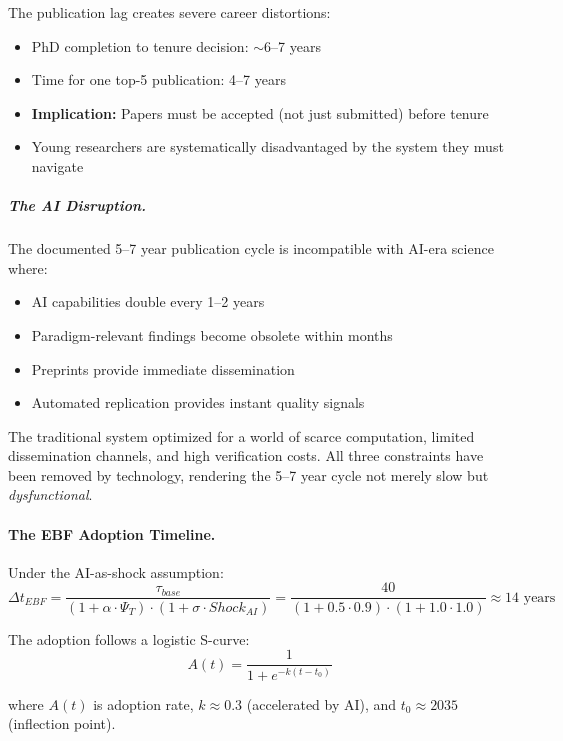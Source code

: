 The publication lag creates severe career distortions:
\begin{itemize}[nosep]
    \item PhD completion to tenure decision: $\sim$6--7 years
    \item Time for one top-5 publication: 4--7 years
    \item \textbf{Implication:} Papers must be accepted (not just submitted) before tenure
    \item Young researchers are systematically disadvantaged by the system they must navigate
\end{itemize}

\subparagraph{The AI Disruption.}

The documented 5--7 year publication cycle is incompatible with AI-era science where:
\begin{itemize}[nosep]
    \item AI capabilities double every 1--2 years
    \item Paradigm-relevant findings become obsolete within months
    \item Preprints provide immediate dissemination
    \item Automated replication provides instant quality signals
\end{itemize}

The traditional system optimized for a world of scarce computation, limited
dissemination channels, and high verification costs. All three constraints
have been removed by technology, rendering the 5--7 year cycle not merely
slow but \textit{dysfunctional}.

\paragraph{The EBF Adoption Timeline.}

Under the AI-as-shock assumption:
\begin{equation}
\Delta t_{EBF} = \frac{\tau_{base}}{(1 + \alpha \cdot \Psi_T) \cdot (1 + \sigma \cdot Shock_{AI})}
= \frac{40}{(1 + 0.5 \cdot 0.9) \cdot (1 + 1.0 \cdot 1.0)} \approx 14 \text{ years}
\end{equation}

The adoption follows a logistic S-curve:
\begin{equation}
A(t) = \frac{1}{1 + e^{-k(t - t_0)}}
\end{equation}

where $A(t)$ is adoption rate, $k \approx 0.3$ (accelerated by AI), and $t_0 \approx 2035$
(inflection point).

